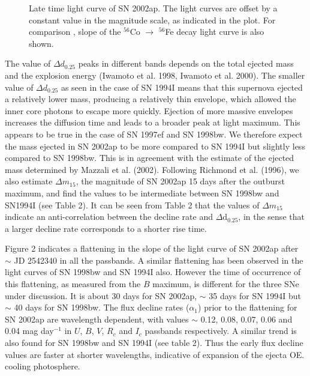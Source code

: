 \begin{figure}
\caption{ Late time light curve of SN 2002ap. The light curves are offset by a
constant value in the magnitude scale, as indicated in the plot. For comparison
, slope of the ${}^{56}$Co $\rightarrow$ ${}^{56}$Fe decay light curve is also shown.} 
\end{figure}

The value of $\Delta d_{0.25}$ peaks in different bands depends on the total 
ejected mass and the explosion energy (Iwamoto et al. 1998, 
Iwamoto et al. 2000).
The smaller value of $\Delta d_{0.25}$ as seen in the case of SN 1994I
means that this supernova ejected a relatively lower mass, producing a 
relatively thin envelope, which allowed the inner core photons
to escape more quickly. Ejection of more massive envelopes increases the
diffusion time and leads to a broader peak at light maximum.
This appears to be true in the case of SN 1997ef and SN 1998bw. We
therefore expect the mass ejected in SN 2002ap to be more compared to 
SN 1994I but slightly less compared to SN 1998bw. This is in agreement 
with the estimate of the ejected mass determined by Mazzali et al. (2002). 
Following Richmond et al. (1996), we also estimate $\Delta m_{15}$, the 
magnitude of SN 2002ap 15 days after the outburst maximum, and 
find the values to be intermediate between SN 1998bw and SN1994I (see Table 2). 
It can be seen from Table 2 that the values of $\Delta m_{15}$ indicate an
anti-correlation between the decline rate and $\Delta$d$_{0.25}$, in the sense 
that a larger decline rate corresponds to a shorter rise time.

Figure 2 indicates a flattening in the slope of the light curve of
SN 2002ap after $\sim$ JD 2542340 in all the passbands.
A similar flattening has been observed in the light curves of SN 1998bw and 
SN 1994I also. However the time of occurrence of this flattening, as measured from
the $B$ maximum, is different for the three SNe under discussion. It is about 
30 days for SN 2002ap, $\sim$ 35 days for SN 1994I but $\sim$ 40 days for SN 1998bw.
The flux decline rates ($\alpha_1$) prior to the flattening for SN 2002ap are wavelength dependent, with 
values $\sim$ 0.12, 0.08, 0.07, 0.06 and 0.04 mag day$^{-1}$ in $U$, $B$, $V$, $R_c$ and 
$I_c$ passbands respectively. A similar trend is also found for SN 1998bw and SN 1994I (see table 2).
 Thus the early flux decline values are faster at shorter 
wavelengths, indicative of expansion of the ejecta OE. cooling photosphere. 

